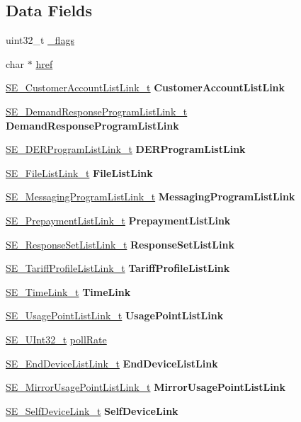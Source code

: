 \subsection*{Data Fields}
\begin{DoxyCompactItemize}
\item 
uint32\+\_\+t \hyperlink{group__DeviceCapability_ga98256bcf33639c1d6e735d1079fd2069}{\+\_\+flags}
\item 
char $\ast$ \hyperlink{group__DeviceCapability_ga67440b38a37d6f2b067aa93494458133}{href}
\item 
\hyperlink{structSE__CustomerAccountListLink__t}{S\+E\+\_\+\+Customer\+Account\+List\+Link\+\_\+t} {\bfseries Customer\+Account\+List\+Link}
\item 
\hyperlink{structSE__DemandResponseProgramListLink__t}{S\+E\+\_\+\+Demand\+Response\+Program\+List\+Link\+\_\+t} {\bfseries Demand\+Response\+Program\+List\+Link}
\item 
\hyperlink{structSE__DERProgramListLink__t}{S\+E\+\_\+\+D\+E\+R\+Program\+List\+Link\+\_\+t} {\bfseries D\+E\+R\+Program\+List\+Link}
\item 
\hyperlink{structSE__FileListLink__t}{S\+E\+\_\+\+File\+List\+Link\+\_\+t} {\bfseries File\+List\+Link}
\item 
\hyperlink{structSE__MessagingProgramListLink__t}{S\+E\+\_\+\+Messaging\+Program\+List\+Link\+\_\+t} {\bfseries Messaging\+Program\+List\+Link}
\item 
\hyperlink{structSE__PrepaymentListLink__t}{S\+E\+\_\+\+Prepayment\+List\+Link\+\_\+t} {\bfseries Prepayment\+List\+Link}
\item 
\hyperlink{structSE__ResponseSetListLink__t}{S\+E\+\_\+\+Response\+Set\+List\+Link\+\_\+t} {\bfseries Response\+Set\+List\+Link}
\item 
\hyperlink{structSE__TariffProfileListLink__t}{S\+E\+\_\+\+Tariff\+Profile\+List\+Link\+\_\+t} {\bfseries Tariff\+Profile\+List\+Link}
\item 
\hyperlink{structSE__TimeLink__t}{S\+E\+\_\+\+Time\+Link\+\_\+t} {\bfseries Time\+Link}
\item 
\hyperlink{structSE__UsagePointListLink__t}{S\+E\+\_\+\+Usage\+Point\+List\+Link\+\_\+t} {\bfseries Usage\+Point\+List\+Link}
\item 
\hyperlink{group__UInt32_ga70bd4ecda3c0c85d20779d685a270cdb}{S\+E\+\_\+\+U\+Int32\+\_\+t} \hyperlink{group__DeviceCapability_gad92ad6a3b915fb56c09a651873754141}{poll\+Rate}
\item 
\hyperlink{structSE__EndDeviceListLink__t}{S\+E\+\_\+\+End\+Device\+List\+Link\+\_\+t} {\bfseries End\+Device\+List\+Link}
\item 
\hyperlink{structSE__MirrorUsagePointListLink__t}{S\+E\+\_\+\+Mirror\+Usage\+Point\+List\+Link\+\_\+t} {\bfseries Mirror\+Usage\+Point\+List\+Link}
\item 
\hyperlink{structSE__SelfDeviceLink__t}{S\+E\+\_\+\+Self\+Device\+Link\+\_\+t} {\bfseries Self\+Device\+Link}
\end{DoxyCompactItemize}


